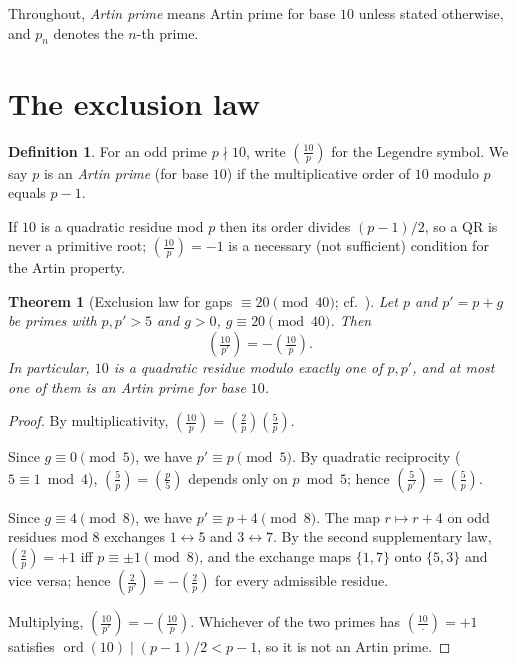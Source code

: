 \documentclass[11pt]{amsart}
\newtheorem{theorem}{Theorem}
\theoremstyle{definition}
\newtheorem{definition}{Definition}
\newcommand{\Lsym}[2]{\left(\tfrac{#1}{#2}\right)}
\begin{document}
Throughout, \emph{Artin prime} means Artin prime for base $10$ unless stated
otherwise, and $p_n$ denotes the $n$-th prime.

\section{The exclusion law}
\label{sec:theorem}

\begin{definition}
	For an odd prime $p \nmid 10$, write $\Lsym{10}{p}$ for the Legendre symbol.
	We say $p$ is an \emph{Artin prime} (for base $10$) if the multiplicative order
	of $10$ modulo $p$ equals $p - 1$.
\end{definition}

If $10$ is a quadratic residue mod $p$ then its order divides $(p-1)/2$, so a
QR is never a primitive root; $\Lsym{10}{p} = -1$ is a necessary (not
sufficient) condition for the Artin property.

\begin{theorem}[Exclusion law for gaps $\equiv 20 \pmod{40}$; cf.\ {\rm\cite[Thm.~1.1]{TinkovaWaxmanZindulka2023}}]
	\label{thm:exclusion}
	Let $p$ and $p' = p + g$ be primes with $p, p' > 5$ and $g > 0$,
	$g \equiv 20 \pmod{40}$.
	Then
	\[
		\Lsym{10}{p'} = -\Lsym{10}{p}.
	\]
	In particular, $10$ is a quadratic residue modulo exactly one of $p, p'$, and
	at most one of them is an Artin prime for base $10$.
\end{theorem}

\begin{proof}
	By multiplicativity, $\Lsym{10}{p} = \Lsym{2}{p}\Lsym{5}{p}$.

	Since $g \equiv 0 \pmod 5$, we have $p' \equiv p \pmod 5$. By quadratic
	reciprocity ($5 \equiv 1 \bmod 4$), $\Lsym{5}{p} = \Lsym{p}{5}$ depends only on
	$p \bmod 5$; hence $\Lsym{5}{p'} = \Lsym{5}{p}$.

	Since $g \equiv 4 \pmod 8$, we have $p' \equiv p + 4 \pmod 8$. The map
	$r \mapsto r + 4$ on odd residues mod $8$ exchanges $1 \leftrightarrow 5$ and
	$3 \leftrightarrow 7$. By the second supplementary law,
	$\Lsym{2}{p} = +1$ iff $p \equiv \pm 1 \pmod 8$, and the exchange maps
	$\{1, 7\}$ onto $\{5, 3\}$ and vice versa; hence $\Lsym{2}{p'} = -\Lsym{2}{p}$
	for every admissible residue.

	Multiplying, $\Lsym{10}{p'} = -\Lsym{10}{p}$. Whichever of the two primes has
	$\Lsym{10}{\cdot} = +1$ satisfies $\operatorname{ord}(10) \mid (p-1)/2 < p-1$, so it
	is not an Artin prime.
\end{proof}
\end{document}
